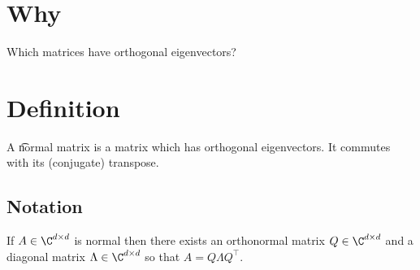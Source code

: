 
\section*{Why}

Which matrices have orthogonal eigenvectors?

\section*{Definition}

A \t{normal matrix} is a matrix which has orthogonal eigenvectors.
It commutes with its (conjugate) transpose.

\subsection*{Notation}

If $A \in \C ^{d \times d}$ is normal then there exists an orthonormal matrix $Q \in \C ^{d \times d}$ and a diagonal matrix $\Lambda  \in \C ^{d \times d}$ so that $A = Q\Lambda  Q^\top $.

\blankpage